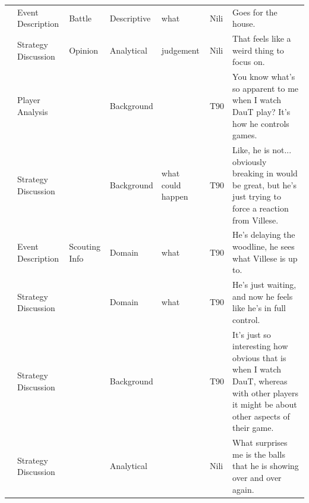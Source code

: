 {\begin{longtable}{@{}>{\theAppRow}r|L{2.3cm}L{2.2cm}L{1.4cm}L{2.2cm}L{0.5cm}U{5.6cm}@{}}
    & Event Description     & Battle               & Descriptive   & what              & Nili    & Goes for the house.                                                                                                                                                                                                      \\
    & Strategy Discussion   & Opinion              & Analytical  & judgement         & Nili    & That feels like a weird thing to focus on.                                                                                                                                                                               \\
    & Player Analysis       &                      & Background  &                   & T90     & You know what's so apparent to me when I watch DauT play? It's how he controls games.                                                                                                                                    \\
    & Strategy Discussion   &                      & Background  & what could happen & T90     & Like, he is not... obviously breaking in would be great, but he's just trying to force a reaction from Villese.                                                                                                          \\
    & Event Description     & Scouting Info        & Domain      & what              & T90     & He's delaying the woodline, he sees what Villese is up to.                                                                                                                                                               \\
    & Strategy Discussion   &                      & Domain      & what              & T90     & He's just waiting, and now he feels like he's in full control.                                                                                                                                                           \\
    & Strategy Discussion   &                      & Background  &                   & T90     & It's just so interesting how obvious that is when I watch DauT, whereas with other players it might be about other aspects of their game.                                                                                \\
    & Strategy Discussion   &                      & Analytical  &                   & Nili    & What surprises me is the balls that he is showing over and over again.                                                                                                                                                   \\

\end{longtable}}
